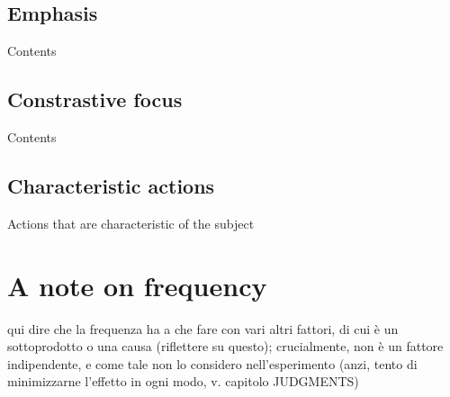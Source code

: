 \subsection{Emphasis} 

Contents

\subsection{Constrastive focus} 

Contents

\subsection{Characteristic actions} 

Actions that are characteristic of the subject


\section{A note on frequency}

qui dire che la frequenza ha a che fare con vari altri fattori, di cui è un sottoprodotto o una causa (riflettere su questo); crucialmente, non è un fattore indipendente, e come tale non lo considero nell'esperimento (anzi, tento di minimizzarne l'effetto in ogni modo, v. capitolo JUDGMENTS)





